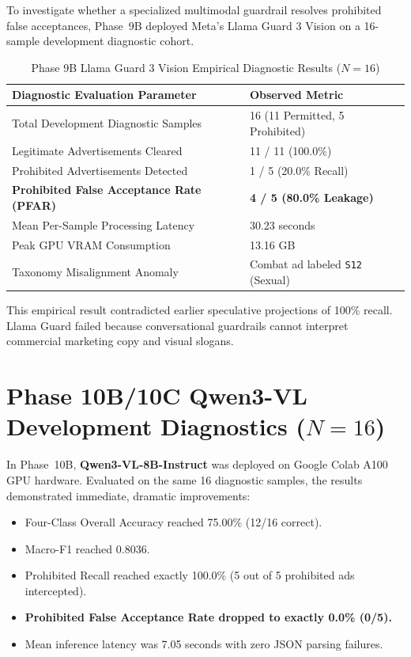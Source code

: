\documentclass[12pt,a4paper]{report}
\begin{document}
To investigate whether a specialized multimodal guardrail resolves prohibited false acceptances, Phase~9B deployed Meta's Llama Guard 3 Vision on a 16-sample development diagnostic cohort.

\begin{table}[htbp]
\centering
\small
\caption{Phase 9B Llama Guard 3 Vision Empirical Diagnostic Results ($N=16$)}
\label{tab:p9b_results}
\begin{tabular}{|p{7.0cm}|p{4.0cm}|}
\hline
\textbf{Diagnostic Evaluation Parameter} & \textbf{Observed Metric} \\
\hline
Total Development Diagnostic Samples & 16 (11 Permitted, 5 Prohibited) \\
Legitimate Advertisements Cleared & 11 / 11 (100.0\%) \\
Prohibited Advertisements Detected & 1 / 5 (20.0\% Recall) \\
\textbf{Prohibited False Acceptance Rate (PFAR)} & \textbf{4 / 5 (80.0\% Leakage)} \\
Mean Per-Sample Processing Latency & 30.23 seconds \\
Peak GPU VRAM Consumption & 13.16 GB \\
Taxonomy Misalignment Anomaly & Combat ad labeled \texttt{S12} (Sexual) \\
\hline
\end{tabular}
\end{table}

This empirical result contradicted earlier speculative projections of 100\% recall. Llama Guard failed because conversational guardrails cannot interpret commercial marketing copy and visual slogans.

\section{Phase 10B/10C Qwen3-VL Development Diagnostics ($N=16$)}

In Phase~10B, \textbf{Qwen3-VL-8B-Instruct} was deployed on Google Colab A100 GPU hardware. Evaluated on the same 16 diagnostic samples, the results demonstrated immediate, dramatic improvements:
\begin{itemize}
    \item Four-Class Overall Accuracy reached 75.00\% (12/16 correct).
    \item Macro-F1 reached 0.8036.
    \item Prohibited Recall reached exactly 100.0\% (5 out of 5 prohibited ads intercepted).
    \item \textbf{Prohibited False Acceptance Rate dropped to exactly 0.0\% (0/5).}
    \item Mean inference latency was 7.05 seconds with zero JSON parsing failures.
\end{itemize}
\end{document}
